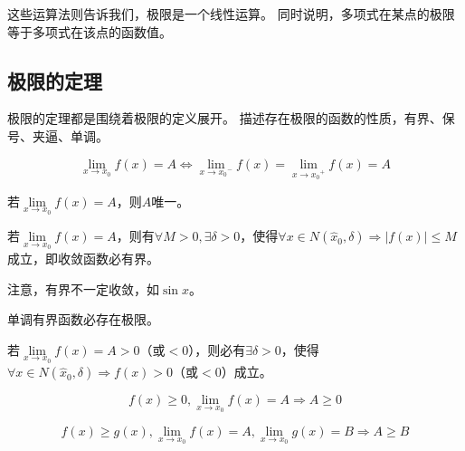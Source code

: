 这些运算法则告诉我们，极限是一个线性运算。
同时说明，多项式在某点的极限等于多项式在该点的函数值。

\subsection{极限的定理}

极限的定理都是围绕着极限的定义展开。
描述存在极限的函数的性质，有界、保号、夹逼、单调。

\begin{theorem}[左右极限定理]
\[
\underset{x\rightarrow x_0}{\lim}f\left( x \right) =A\Leftrightarrow \underset{x\rightarrow {x_0}^-}{\lim}f\left( x \right) =\underset{x\rightarrow {x_0}^+}{\lim}f\left( x \right) =A
\]
\end{theorem}

\begin{theorem}[唯一性定理]
若$\underset{x\rightarrow x_0}{\lim}f\left( x \right) =A$，则$A$唯一。
\end{theorem}

\begin{theorem}[有界性定理]
若$\underset{x\rightarrow x_0}{\lim}f\left( x \right) =A$，则有$\forall M>0,\exists \delta >0$，使得$\forall x\in N\left( \hat{x}_0,\delta \right) \Rightarrow \left| f\left( x \right) \right|\leqslant M$成立，即收敛函数必有界。
\end{theorem}

\begin{tcolorbox}
注意，有界不一定收敛，如$\sin x$。
\end{tcolorbox}

\begin{theorem}[单调有界定理]
单调有界函数必存在极限。
\end{theorem}

\begin{theorem}[局部保号性定理]
若$\underset{x\rightarrow x_0}{\lim}f\left( x \right) =A>0$（或$<0$），则必有$\exists \delta >0$，使得$\forall x\in N\left( \hat{x}_0,\delta \right) \Rightarrow f\left( x \right) >0$（或$<0$）成立。
\end{theorem}

\begin{corollary}
\[
f\left( x \right) \geqslant 0,\underset{x\rightarrow x_0}{\lim}f\left( x \right) =A\Rightarrow A\geqslant 0
\]
\end{corollary}

\begin{corollary}
\[
f\left( x \right) \geqslant g\left( x \right) ,\underset{x\rightarrow x_0}{\lim}f\left( x \right) =A,\underset{x\rightarrow x_0}{\lim}g\left( x \right) =B\Rightarrow A\geqslant B
\]
\end{corollary}

